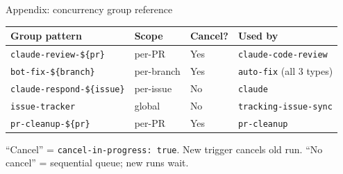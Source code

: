 \documentclass[aspectratio=169,10pt]{beamer}
\begin{document}
\begin{frame}{Appendix: concurrency group reference}
    \vspace{-0.4em}
    \begin{center}
    \renewcommand{\arraystretch}{1.2}
    {\footnotesize
    \begin{tabular}{@{}l l l l@{}}
        \toprule
        \textbf{Group pattern} & \textbf{Scope} & \textbf{Cancel?} & \textbf{Used by} \\
        \midrule
        \texttt{claude-review-\$\{pr\}} & per-PR & Yes & \texttt{claude-code-review} \\
        \texttt{bot-fix-\$\{branch\}} & per-branch & Yes & \texttt{auto-fix} (all 3 types) \\
        \texttt{claude-respond-\$\{issue\}} & per-issue & No & \texttt{claude} \\
        \texttt{issue-tracker} & global & No & \texttt{tracking-issue-sync} \\
        \texttt{pr-cleanup-\$\{pr\}} & per-PR & Yes & \texttt{pr-cleanup} \\
        \bottomrule
    \end{tabular}
    }
    \end{center}
    \vspace{0.5em}
    \textcolor{dimwhite}{\footnotesize ``Cancel'' = \texttt{cancel-in-progress: true}. New trigger cancels old run. ``No cancel'' = sequential queue; new runs wait.}
\end{frame}
\end{document}
